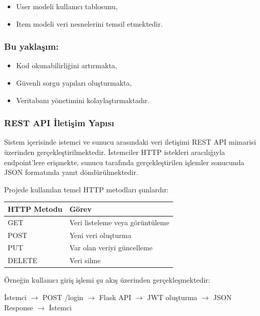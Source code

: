 \begin{itemize}[leftmargin=*]
    \item User modeli kullanıcı tablosunu,
    \item Item modeli veri nesnelerini temsil etmektedir.
\end{itemize}

\subsubsection{Bu yaklaşım:}

\begin{itemize}[leftmargin=*]
    \item Kod okunabilirliğini artırmakta,
    \item Güvenli sorgu yapıları oluşturmakta,
    \item Veritabanı yönetimini kolaylaştırmaktadır.
\end{itemize}

\subsubsection{REST API İletişim Yapısı}

Sistem içerisinde istemci ve sunucu arasındaki veri iletişimi REST API mimarisi üzerinden gerçekleştirilmektedir. İstemciler HTTP istekleri aracılığıyla endpoint’lere erişmekte, sunucu tarafında gerçekleştirilen işlemler sonucunda JSON formatında yanıt döndürülmektedir.

Projede kullanılan temel HTTP metodları şunlardır:

\begin{table}[H]
\centering
\begin{tabular}{|L{3.5cm}|L{3.5cm}|}
\hline
\textbf{HTTP Metodu} & \textbf{Görev} \\
\hline
GET & Veri listeleme veya görüntüleme \\
\hline
POST & Yeni veri oluşturma \\
\hline
PUT & Var olan veriyi güncelleme \\
\hline
DELETE & Veri silme \\
\hline
\end{tabular}
\end{table}

Örneğin kullanıcı giriş işlemi şu akış üzerinden gerçekleşmektedir:

İstemci $\rightarrow$ POST /login $\rightarrow$ Flask API $\rightarrow$ JWT oluşturma $\rightarrow$ JSON Response $\rightarrow$ İstemci

